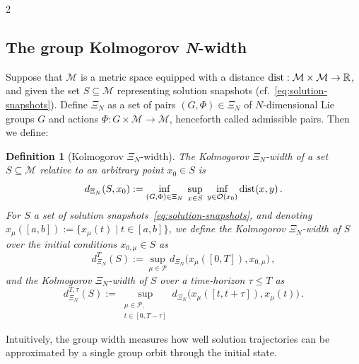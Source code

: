 \documentclass{article}
\newtheorem{definition}[theorem]{Definition}
\newcommand{\M}{\mathcal{M}}                                %
\newcommand{\R}{\mathbb{R}}                                 %
\newcommand{\state}{x}
\begin{document}
\begin{multicols}{2}
\subsection{The group Kolmogorov \textit{N}-width}\label{ssec:group-N-width}
Suppose that $\M$ is a metric space equipped with a distance $\textnormal{dist}:\M\times\M\rightarrow\R$, and given the set $S \subseteq \M$ representing solution snapshots (cf.~\eqref{eq:solution-snapshots}). Define $\Xi_N$ as a set of pairs $(G,\Phi)\in\Xi_N$ of $N$-dimensional Lie groups $G$ and actions $\Phi:G\times\M\rightarrow\M$, henceforth called admissible pairs. Then we define:
\begin{definition}[Kolmogorov $\Xi_N$-width]
    The Kolmogorov $\Xi_N$-width of a set $S\subseteq\M$ relative to an arbitrary point $\state_0\in S$ is
    \begin{equation}\label{eq:group-width}
        d_{\Xi_N}(S,\state_0) := \inf_{\substack{(G,\Phi) \in \Xi_N}}\; \sup_{\state \in S}\; \inf_{y \in \mathcal{O}(\state_0)} \textnormal{dist}(\state,y) \,.
    \end{equation} 
    For $S$ a set of solution snapshots~\eqref{eq:solution-snapshots}, and denoting $\state_\mu([a,b]):=\{\state_\mu(t)\;|\; t\in[a,b]\}$, we define the Kolmogorov $\Xi_N$-width of $S$ over the initial conditions $\state_{0,\mu} \in S$ as
    \begin{equation}\label{eq:group-width-over-IC}
        d^T_{\Xi_N}(S) := \sup_{\mu \in \mathcal{P}} d_{\Xi_N}\big(\state_{\mu}([0,T]),\state_{0,\mu}\big)\,,
    \end{equation}
    and the Kolmogorov $\Xi_N$-width of $S$ over a time-horizon $\tau \leq T$ as
    \begin{equation}\label{eq:group-width-over-tau}
        d^{T,\tau}_{\Xi_N}(S) := \sup_{
            \substack{\mu \in \mathcal{P},\\ 
                        t \in [0,T-\tau]}}
         d_{\Xi_N}\big(\state_{\mu}([t,t+\tau]),\state_{\mu}(t)\big)\,.
    \end{equation}
\end{definition}
Intuitively, the group width measures how well solution trajectories can be approximated by a single group orbit through the initial state.


\end{multicols}
\end{document}
